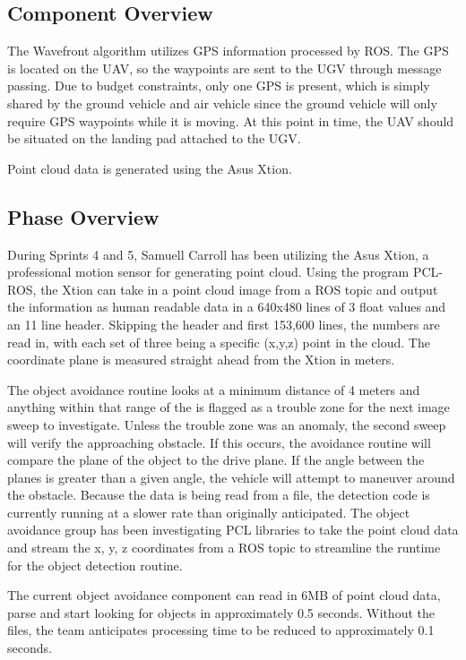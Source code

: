 \subsection{Component  Overview}
The Wavefront algorithm utilizes GPS information processed by ROS. The GPS is located on the UAV, so the waypoints are sent to the UGV through message passing. Due to budget constraints, only one GPS is present, which is simply shared by the ground vehicle and air vehicle since the ground vehicle will only require GPS waypoints while it is moving. At this point in time, the UAV should be situated on the landing pad attached to the UGV.

Point cloud data is generated using the Asus Xtion.

\subsection{Phase Overview}
During Sprints 4 and 5, Samuell Carroll has been utilizing the Asus Xtion, a professional motion sensor for generating point cloud. Using the program PCL-ROS, the Xtion can take in a point cloud image from a ROS topic and output the information as human readable data in a 640x480 lines of 3 float values and an 11 line header. Skipping the header and first 153,600 lines, the numbers are read in, with each set of three being a specific (x,y,z) point in the cloud. The coordinate plane is measured straight ahead from the Xtion in meters. 

The object avoidance routine looks at a minimum distance of 4 meters and anything within that range of the is flagged as a trouble zone for the next image sweep to investigate. Unless the trouble zone was an anomaly, the second sweep will verify the approaching obstacle. If this occurs, the avoidance routine will compare the plane of the object to the drive plane. If the angle between the planes is greater than a given angle, the vehicle will attempt to maneuver around the obstacle. Because the data is being read from a file, the detection code is currently running at a slower rate than originally anticipated. The object avoidance group has been investigating PCL libraries to take the point cloud data and stream the x, y, z coordinates from a ROS topic to streamline the runtime for the object detection routine.

The current object avoidance component can read in 6MB of point cloud data, parse and start looking for objects in approximately 0.5 seconds. Without the files, the team anticipates processing time to be reduced to approximately 0.1 seconds.

